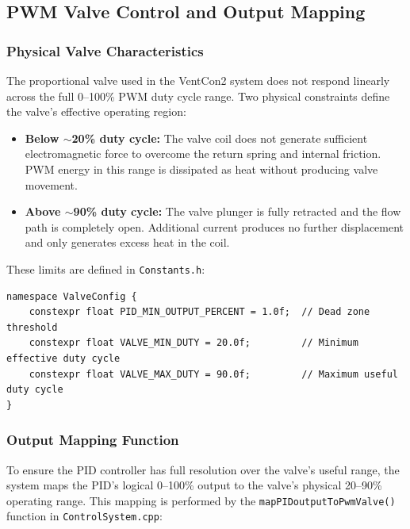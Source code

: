 \subsection{PWM Valve Control and Output Mapping}
\label{sec:valve-mapping}

\subsubsection{Physical Valve Characteristics}
The proportional valve used in the VentCon2 system does not respond linearly across the full 0--100\% PWM duty cycle range. Two physical constraints define the valve's effective operating region:

\begin{itemize}
    \item \textbf{Below $\sim$20\% duty cycle:} The valve coil does not generate sufficient electromagnetic force to overcome the return spring and internal friction. PWM energy in this range is dissipated as heat without producing valve movement.
    \item \textbf{Above $\sim$90\% duty cycle:} The valve plunger is fully retracted and the flow path is completely open. Additional current produces no further displacement and only generates excess heat in the coil.
\end{itemize}

These limits are defined in \texttt{Constants.h}:

\begin{lstlisting}[caption=Valve Operating Range Constants]
namespace ValveConfig {
    constexpr float PID_MIN_OUTPUT_PERCENT = 1.0f;  // Dead zone threshold
    constexpr float VALVE_MIN_DUTY = 20.0f;         // Minimum effective duty cycle
    constexpr float VALVE_MAX_DUTY = 90.0f;         // Maximum useful duty cycle
}
\end{lstlisting}

\subsubsection{Output Mapping Function}
To ensure the PID controller has full resolution over the valve's useful range, the system maps the PID's logical 0--100\% output to the valve's physical 20--90\% operating range. This mapping is performed by the \texttt{mapPIDoutputToPwmValve()} function in \texttt{ControlSystem.cpp}:

